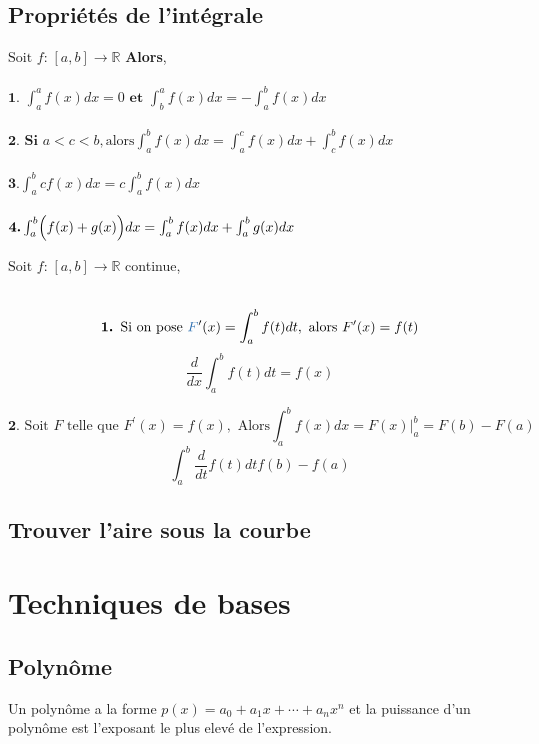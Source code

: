 \documentclass[2pt]{report}
\begin{document}
\begin{multicols*}{3}
\section{Propriétés de l'intégrale}

\begin{Concept}{}{}
$\text{Soit } f\text{:} \; [a,b] \rightarrow \mathbb{R}$ \textbf{Alors}, \\\\
$\textbf{1. } \int_{a}^{a}f(x)dx = 0 \textbf{ et } \int_{b}^{a}f(x)dx = - \int_{a}^{b}f(x)dx$ \\\\
$\textbf{2. Si } a < c < b,  \text{alors} \int_{a}^{b}f(x)dx = \int_{a}^{c}f(x)dx + \int_{c}^{b}f(x)dx $ \\\\
$\textbf{3.} \int_{a}^{b}cf(x)dx = c\int_{a}^{b}f(x)dx$ \\\\
$\textbf{4.} \int_{a}^{b}\Bigl(f(x) + g(x)\Bigr)dx = \int_{a}^{b}f(x)dx + \int_{a}^{b}g(x)dx$
\end{Concept}

\begin{Definitionx*}{}{}
  $\text{Soit } f\text{:} \; [a,b] \rightarrow \mathbb{R}$ continue, \\\\ 
  \begin{center}
  $$\textbf{1. } \text{Si on pose } \textcolor{myb}{F}^{\prime}(x) = \int_{a}^{b}f(t)dt, \text{ alors } 
  F^{\prime}(x) = f(t)$$ 
  \big\Updownarrow
  $$\dfrac{d}{dx}\int_{a}^{b}f(t)dt = f(x)$$
  \end{center}

  \begin{center}
  $$\textbf{2. } \text{Soit } F \text{ telle que } F^{\prime}(x) = f(x), \text{ Alors} 
  \int_{a}^{b}f(x)dx = F(x)  \bigg|_{a}^{b} = F(b) - F(a) $$
  \big\Updownarrow
  $$\int_{a}^{b}\dfrac{d}{dt}f(t)dt  f(b) - f(a)$$ 
\end{center}
\end{Definitionx*}


\section{Trouver l'aire sous la courbe}


\chapter{Techniques de bases}
\section{Polynôme}
\begin{Definitionx*}{}{}
  Un polynôme a la forme $p(x) = a_0 + a_1x + \cdots + a_nx^n$ et la \textcolor{myb}{puissance} d'un polynôme 
  est l'exposant le plus elevé de l'expression.    
\end{Definitionx*}


\end{multicols*}
\end{document}
